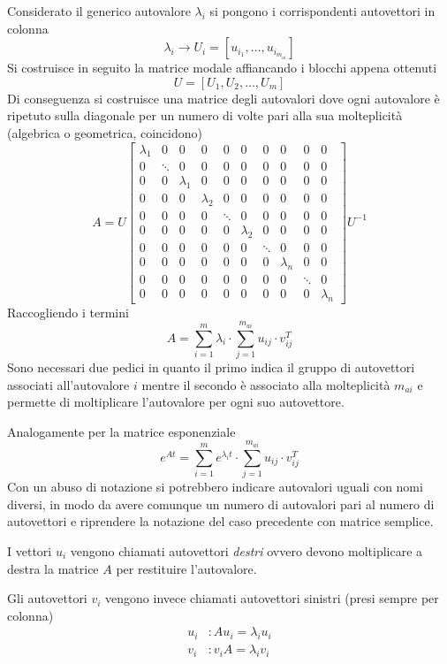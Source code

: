 Considerato il generico autovalore $\lambda_i$ si pongono i corrispondenti
autovettori in colonna
$$
\lambda_i \rightarrow U_i=[u_{i_1},\ldots,u_{i_{m_{ai}}}]
$$
Si costruisce in seguito la matrice modale affiancando i blocchi appena ottenuti
$$
U = [U_1,U_2,\ldots,U_m]
$$
Di conseguenza si costruisce una matrice degli autovalori dove ogni autovalore
è ripetuto sulla diagonale per un numero di volte pari alla sua molteplicità
(algebrica o geometrica, coincidono)
$$
A=U
\begin{bmatrix}
\lambda_1 &0 &0 &0 &0 &0 &0 &0 &0 &0 \\
0    &\ddots &0 &0 &0 &0 &0 &0 &0 &0 \\
0 &0 &\lambda_1 &0 &0 &0 &0 &0 &0 &0 \\
0 &0 &0 &\lambda_2 &0 &0 &0 &0 &0 &0 \\
0 &0 &0 &0    &\ddots &0 &0 &0 &0 &0 \\
0 &0 &0 &0 &0 &\lambda_2 &0 &0 &0 &0 \\
0 &0 &0 &0 &0 &0    &\ddots &0 &0 &0 \\
0 &0 &0 &0 &0 &0 &0 &\lambda_n &0 &0 \\
0 &0 &0 &0 &0 &0 &0 &0    &\ddots &0 \\
0 &0 &0 &0 &0 &0 &0 &0 &0 &\lambda_n
\end{bmatrix}U^{-1}
$$
Raccogliendo i termini
$$
A = \sum_{i=1}^m \lambda_i \cdot \sum_{j=1}^{m_{ai}} u_{ij}\cdot v_{ij}^T
$$
Sono necessari due pedici in quanto il primo indica il gruppo di autovettori
associati all'autovalore $i$ mentre il secondo è associato alla molteplicità
$m_{ai}$ e permette di moltiplicare l'autovalore per ogni suo autovettore.

Analogamente per la matrice esponenziale
$$
e^{At} = \sum_{i=1}^m e^{\lambda_i t} \cdot \sum_{j=1}^{m_{ai}} u_{ij}\cdot
v_{ij}^T
$$
Con un abuso di notazione si potrebbero indicare autovalori uguali con nomi
diversi, in modo da avere comunque un numero di autovalori pari al numero di
autovettori e riprendere la notazione del caso precedente con matrice semplice.

I vettori  $u_i$ vengono chiamati autovettori \textit{destri} ovvero devono
moltiplicare a destra la matrice $A$ per restituire l'autovalore.

Gli autovettori $v_i$ vengono invece chiamati autovettori sinistri (presi
sempre per colonna)
$$\begin{aligned}
u_i &: Au_i = \lambda_i u_i\\
v_i &: v_iA = \lambda_i v_i
\end{aligned}$$

